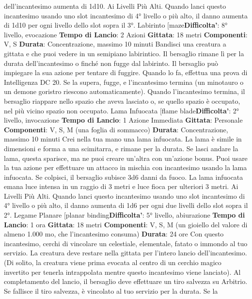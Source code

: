 \begin{multicols}{2}
dell’incantesimo aumenta di 1d10.
Ai Livelli Più Alti. Quando lanci questo incantesimo
usando uno slot incantesimo di 4° livello o più alto, il
danno aumenta di 1d10 per ogni livello dello slot sopra
il 3°.
Labirinto
[maze\textbf{Difficolta'}:
8° livello, evocazione
\textbf{Tempo di Lancio}: 2 Azioni
\textbf{Gittata}: 18 metri
\textbf{Componenti}: V, S
\textbf{Durata}: Concentrazione, massimo 10 minuti
Bandisci una creatura a gittata e che puoi vedere in un
semipiano labirintico. Il bersaglio rimane lì per la durata
dell’incantesimo o finché non fugge dal labirinto.
Il bersaglio può impiegare la sua azione per tentare di
fuggire. Quando lo fa, effettua una prova di Intelligenza
DC 20. Se la supera, fugge, e l’incantesimo termina (un
minotauro o un demone goristro riescono
automaticamente).
Quando l’incantesimo termina, il bersaglio riappare
nello spazio che aveva lasciato o, se quello spazio è
occupato, nel più vicino spazio non occupato.
Lama Infuocata
[flame blade\textbf{Difficolta'}:
2° livello, invocazione
\textbf{Tempo di Lancio}: 1 Azione Immediata
\textbf{Gittata}: Personale
\textbf{Componenti}: V, S, M (una foglia di sommacco)
\textbf{Durata}: Concentrazione, massimo 10 minuti
Crei nella tua mano una lama infuocata. La lama è
simile in dimensioni e forma a una scimitarra, e rimane
per la durata. Se lasci andare la lama, questa sparisce,
ma ne puoi creare un’altra con un’azione bonus.
Puoi usare la tua azione per effettuare un attacco in
mischia con incantesimo usando la lama infuocata. Se
colpisci, il bersaglio subisce 3d6 danni da fuoco.
La lama infuocata emana luce intensa in un raggio di 3
metri e luce fioca per ulteriori 3 metri.
Ai Livelli Più Alti. Quando lanci questo incantesimo
usando uno slot incantesimo di 4° livello o più alto, il
danno aumenta di 1d6 per ogni due livelli dello slot
sopra il 2°.
Legame Planare
[planar binding\textbf{Difficolta'}:
5° livello, abiurazione
\textbf{Tempo di Lancio}: 1 ora
\textbf{Gittata}: 18 metri
\textbf{Componenti}: V, S, M (un gioiello del valore di almeno
1.000 mo, che l’incantesimo consuma)
\textbf{Durata}: 24 ore
Con questo incantesimo, cerchi di vincolare un
celestiale, elementale, fatato o immondo al tuo servizio.
La creatura deve restare nella gittata per l’intero lancio
dell’incantesimo. (Di solito, la creatura viene prima
evocata al centro di un cerchio magico invertito per
tenerla intrappolata mentre questo incantesimo viene
lanciato). Al completamento del lancio, il bersaglio deve
effettuare un tiro salvezza su Arbitrio. Se fallisce il tiro
salvezza, è vincolato al tuo servizio per la durata. Se la

\end{multicols}
